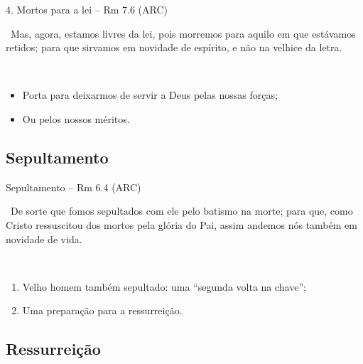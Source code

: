 \documentclass[12pt,aspectratio=169]{beamer}
\newcommand{\ver}[1]{%
    \raisebox{0.50ex}{%
        \scalebox{1.1}{%
            \pmb{\textbf{\textcolor{BSpbg}{#1}}}%
        }%
    }%
}
\newcommand{\QUOTE}[1]{%
    \par\noindent\hspace*{0.05\linewidth}%
    \begin{minipage}{0.9\linewidth}%
        \linespread{1.35}\large{#1}%
    \end{minipage}%
}
\newcommand{\RED}[1]{{\textcolor{TXred}{#1}}}
\newcommand{\YEL}[1]{{\textcolor{TXyel}{#1}}}
\newcommand{\GRE}[1]{{\textcolor{TXgre}{#1}}}
\newcommand{\BRI}[1]{{\textcolor{BSpbg}{#1}}}   %
\begin{document}
    \begin{frame}{4. \YEL{Mortos para a lei} -- Rm 7.6 (ARC)}
        \QUOTE{%
            \ver{6}~Mas, agora, estamos \YEL{livres da lei}, pois \YEL{morremos} para aquilo em
            que estávamos retidos; para que \GRE{sirvamos em novidade de espírito}, e não na
            \RED{velhice da letra}.
        }
        \\[1.5\bigskipamount]
        \begin{itemize}
            \item<2-> Porta para deixarmos de servir a Deus \BRI{pelas nossas forças};
            \item<3-> Ou \BRI{pelos nossos méritos}.
        \end{itemize}
    \end{frame}

    \subsection{Sepultamento}

    \begin{frame}{\YEL{Sepultamento} -- Rm 6.4 (ARC)}
        \QUOTE{%
            \ver{4}~De sorte que fomos \YEL{sepultados} com ele pelo batismo na morte; para que,
            como Cristo \YEL{ressuscitou} dos mortos pela glória do Pai, assim andemos nós
            também em novidade de vida.
        }
        \\[1.5\bigskipamount]
        \begin{enumerate}
            \item<2-> Velho homem também sepultado: uma ``\BRI{segunda volta na chave}'';
            \item<3-> Uma preparação para a \BRI{ressurreição}.
        \end{enumerate}
    \end{frame}

    \subsection{Ressurreição}
\end{document}
